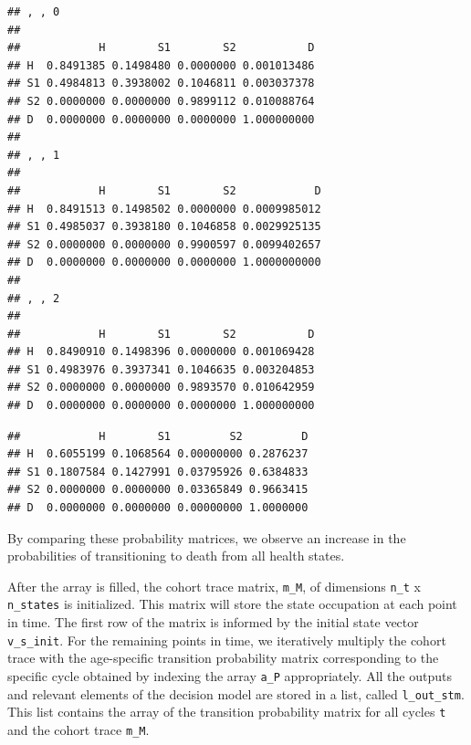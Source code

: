 \documentclass[]{book}
\newenvironment{Shaded}{\begin{snugshade}}{\end{snugshade}}
\newcommand{\DecValTok}[1]{\textcolor[rgb]{0.00,0.00,0.81}{#1}}
\newcommand{\CommentTok}[1]{\textcolor[rgb]{0.56,0.35,0.01}{\textit{#1}}}
\newcommand{\OperatorTok}[1]{\textcolor[rgb]{0.81,0.36,0.00}{\textbf{#1}}}
\newcommand{\NormalTok}[1]{#1}
\begin{document}
\begin{Shaded}
\end{Shaded}

\begin{verbatim}
## , , 0
## 
##            H        S1        S2           D
## H  0.8491385 0.1498480 0.0000000 0.001013486
## S1 0.4984813 0.3938002 0.1046811 0.003037378
## S2 0.0000000 0.0000000 0.9899112 0.010088764
## D  0.0000000 0.0000000 0.0000000 1.000000000
## 
## , , 1
## 
##            H        S1        S2            D
## H  0.8491513 0.1498502 0.0000000 0.0009985012
## S1 0.4985037 0.3938180 0.1046858 0.0029925135
## S2 0.0000000 0.0000000 0.9900597 0.0099402657
## D  0.0000000 0.0000000 0.0000000 1.0000000000
## 
## , , 2
## 
##            H        S1        S2           D
## H  0.8490910 0.1498396 0.0000000 0.001069428
## S1 0.4983976 0.3937341 0.1046635 0.003204853
## S2 0.0000000 0.0000000 0.9893570 0.010642959
## D  0.0000000 0.0000000 0.0000000 1.000000000
\end{verbatim}

\begin{Shaded}
\end{Shaded}

\begin{verbatim}
##            H        S1         S2         D
## H  0.6055199 0.1068564 0.00000000 0.2876237
## S1 0.1807584 0.1427991 0.03795926 0.6384833
## S2 0.0000000 0.0000000 0.03365849 0.9663415
## D  0.0000000 0.0000000 0.00000000 1.0000000
\end{verbatim}

By comparing these probability matrices, we observe an increase in the
probabilities of transitioning to death from all health states.

After the array is filled, the cohort trace matrix, \texttt{m\_M}, of
dimensions \texttt{n\_t} x \texttt{n\_states} is initialized. This
matrix will store the state occupation at each point in time. The first
row of the matrix is informed by the initial state vector
\texttt{v\_s\_init}. For the remaining points in time, we iteratively
multiply the cohort trace with the age-specific transition probability
matrix corresponding to the specific cycle obtained by indexing the
array \texttt{a\_P} appropriately. All the outputs and relevant elements
of the decision model are stored in a list, called \texttt{l\_out\_stm}.
This list contains the array of the transition probability matrix for
all cycles \texttt{t} and the cohort trace \texttt{m\_M}.
\end{document}
